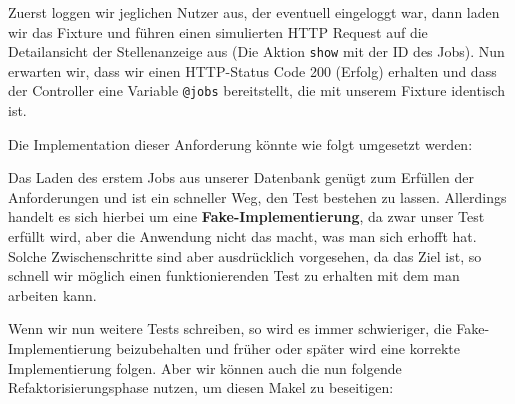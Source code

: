 \tddred
Zuerst loggen wir jeglichen Nutzer aus, der eventuell eingeloggt war, dann laden wir das Fixture und führen einen simulierten HTTP Request auf die Detailansicht der Stellenanzeige aus (Die Aktion \texttt{show} mit der ID des Jobs).
Nun erwarten wir, dass wir einen HTTP-Status Code 200 (Erfolg) erhalten und dass der Controller eine Variable \texttt{@jobs} bereitstellt, die mit unserem Fixture identisch ist.

Die Implementation dieser Anforderung könnte wie folgt umgesetzt werden:
%
%
\begin{ruby}[label=app/controllers/jobs\_controller.rb]
   
   
      
\end{ruby}

\tddgreen
Das Laden des erstem Jobs aus unserer Datenbank genügt zum Erfüllen der Anforderungen und ist ein schneller Weg, den Test bestehen zu lassen. Allerdings handelt es sich hierbei um eine \textbf{Fake-Implementierung}, da zwar unser Test erfüllt wird, aber die Anwendung nicht das macht, was man sich erhofft hat. Solche Zwischenschritte sind aber ausdrücklich vorgesehen, da das Ziel ist, so schnell wir möglich einen funktionierenden Test zu erhalten mit dem man arbeiten kann.

Wenn wir nun weitere Tests schreiben, so wird es immer schwieriger, die Fake\hyp{}Implementierung beizubehalten und früher oder später wird eine korrekte Implementierung folgen.
Aber wir können auch die nun folgende Refaktorisierungsphase nutzen, um diesen Makel zu beseitigen:
\tddrefactor
%
\begin{ruby}[label=app/controllers/jobs\_controller.rb]
 
    \PY{o}{[}\PY{o}{]}
\end{ruby}


